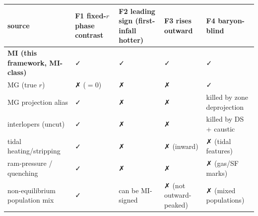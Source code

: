 \documentclass[
]{article}
\newcounter{none} %
\begin{document}
{\def\LTcaptype{none} %
\begin{longtable}[]{@{}
  >{\raggedright\arraybackslash}p{}
  >{\raggedright\arraybackslash}p{}
  >{\raggedright\arraybackslash}p{}
  >{\raggedright\arraybackslash}p{}
  >{\raggedright\arraybackslash}p{}@{}}
\toprule\noalign{}
\begin{minipage}[b]{\linewidth}\raggedright
source
\end{minipage} & \begin{minipage}[b]{\linewidth}\raggedright
F1 fixed-\(r\) phase contrast
\end{minipage} & \begin{minipage}[b]{\linewidth}\raggedright
F2 leading sign (first-infall hotter)
\end{minipage} & \begin{minipage}[b]{\linewidth}\raggedright
F3 rises outward
\end{minipage} & \begin{minipage}[b]{\linewidth}\raggedright
F4 baryon-blind
\end{minipage} \\
\midrule\noalign{}
\endhead
\bottomrule\noalign{}
\endlastfoot
\textbf{MI (this framework, MI-class)} & ✓ & ✓ & ✓ & ✓ \\
MG (true \(r\)) & ✗ (\(=0\)) & ✗ & ✗ & ✓ \\
MG projection alias & ✓ & ✗ & ✗ & killed by zone deprojection \\
interlopers (uncut) & ✓ & ✗ & ✗ & killed by DS + caustic \\
tidal heating/stripping & ✓ & ✗ & ✗ (inward) & ✗ (tidal features) \\
ram-pressure / quenching & ✓ & ✗ & ✗ & ✗ (gas/SF marks) \\
non-equilibrium population mix & ✓ & can be MI-signed & ✗ (not
outward-peaked) & ✗ (mixed populations) \\
\end{longtable}
}
\end{document}
